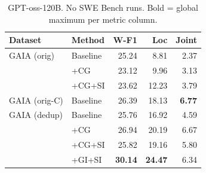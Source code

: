 \begin{table}[h]
\centering\small
\begin{tabular}{ll rrr}
\toprule
\textbf{Dataset} & \textbf{Method} & \textbf{W-F1} & \textbf{Loc} & \textbf{Joint} \\
\midrule
GAIA (orig)   & Baseline  & 25.24 &  8.81 &  2.37 \\
              & +CG       & 23.12 &  9.96 &  3.13 \\
              & +CG+SI    & 23.62 & 12.23 &  3.79 \\
\midrule
GAIA (orig-C) & Baseline  & 26.39 & 18.13 & \textbf{6.77} \\
\midrule
GAIA (dedup)  & Baseline  & 25.76 & 16.92 &  4.59 \\
              & +CG       & 26.94 & 20.19 &  6.67 \\
              & +CG+SI    & 25.82 & 19.16 &  5.80 \\
              & +GI+SI    & \textbf{30.14} & \textbf{24.47} &  6.34 \\
\bottomrule
\end{tabular}
\caption{GPT-oss-120B. No SWE Bench runs.
  Bold = global maximum per metric column.}
\end{table}


